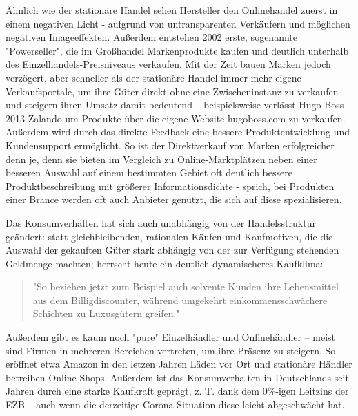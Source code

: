 \begin{folding} %

Ähnlich wie der stationäre Handel sehen Hersteller den Onlinehandel zuerst in einem negativen Licht - aufgrund von untransparenten Verkäufern und möglichen negativen Imageeffekten\cite[S. 20]{Graf}. Außerdem entstehen 2002 erste, sogenannte "Powerseller", die im Großhandel Markenprodukte kaufen und deutlich unterhalb des Einzelhandels-Preisniveaus verkaufen\cite[S. 26]{Graf}. Mit der Zeit bauen Marken jedoch verzögert, aber schneller als der stationäre Handel immer mehr eigene Verkaufsportale, um ihre Güter direkt ohne eine Zwischeninstanz zu verkaufen und steigern ihren Umsatz damit bedeutend – beispielsweise verlässt Hugo Boss 2013 Zalando um Produkte über die eigene Website hugoboss.com zu verkaufen\cite[S. 48f]{Graf}. Außerdem wird durch das direkte Feedback eine bessere Produktentwicklung und Kundensupport ermöglicht\cite[S. 39]{Graf}. So ist der Direktverkauf von Marken erfolgreicher denn je, denn sie bieten im Vergleich zu Online-Marktplätzen neben einer besseren Auswahl auf einem bestimmten Gebiet oft deutlich bessere Produktbeschreibung mit größerer Informationsdichte - sprich, bei Produkten einer Brance werden oft auch Anbieter genutzt, die sich auf diese spezialisieren\cite[S. 18f]{evilcom}.

\end{folding}

\begin{folding} %

Das Konsumverhalten hat sich auch unabhängig von der Handelsstruktur geändert: statt gleichbleibenden, rationalen Käufen und Kaufmotiven, die die Auswahl der gekauften Güter stark abhängig von der zur Verfügung stehenden Geldmenge machten\cite[S. 38]{Schramm}; herrscht heute ein deutlich dynamischeres Kaufklima:
\begin{quote}
"So beziehen jetzt zum Beispiel auch solvente Kunden ihre Lebensmittel aus dem Billigdiscounter, während  umgekehrt  einkommensschwächere  Schichten  zu  Luxusgütern  greifen."\cite[S. 43]{Nitt}
\end{quote}
Außerdem gibt es kaum noch "pure" Einzelhändler und Onlinehändler – meist sind Firmen in mehreren Bereichen vertreten, um ihre Präsenz zu steigern. So eröffnet etwa Amazon in den letzen Jahren Läden vor Ort und stationäre Händler betreiben Online-Shops\cite[S. 50]{Graf}.
Außerdem ist das Konsumverhalten in Deutschlands seit Jahren durch eine starke Kaufkraft geprägt, z. T. dank dem 0\%-igen Leitzins der \ac{EZB}\cite[S. 49]{Ebert} – auch wenn die derzeitige Corona-Situation diese leicht abgeschwächt hat\cite{BfWE}. 

\end{folding}



